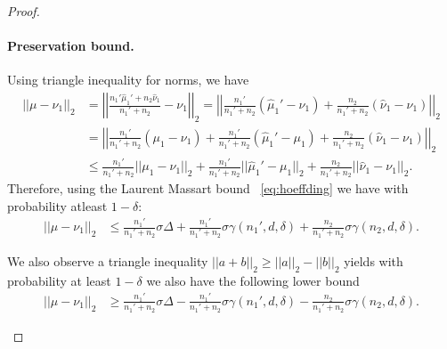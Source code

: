 \begin{proof}
\paragraph{Preservation bound.} Using triangle inequality for norms, we have 
\begin{align*}
    ||\mu - \nu_1||_2
    &
    = 
    \left|\left|\frac{n_1' \hat{\mu}_1' + n_2 \hat{\nu}_1}{n_1' + n_2}
    -
    \nu_1 \right|\right|_2 
    = 
    \left|\left|\frac{n_1'}{n_1' + n_2} (\hat{\mu}_1' - \nu_1) 
    +
    \frac{n_2}{n_1' + n_2} (\hat{\nu}_1 - \nu_1) \right|\right|_2
    \\
    &
    = 
    \left|\left|\frac{n_1'}{n_1' + n_2} (\mu_1 - \nu_1) 
    +
    \frac{n_1'}{n_1' + n_2} (\hat{\mu}_1' - \mu_1) 
    + 
    \frac{n_2}{n_1' + n_2} (\hat{\nu}_1 - \nu_1) \right|\right|_2
    \\
    &
    \leq \frac{n_1'}{n_1' + n_2} ||\mu_1 - \nu_1||_2 +
    \frac{n_1'}{n_1' + n_2} ||\hat{\mu}_1' - \mu_1||_2
    +
    \frac{n_2}{n_1' + n_2} ||\hat{\nu}_1 - \nu_1||_2.
\end{align*}
Therefore, using the Laurent Massart bound ~\eqref{eq:hoeffding} we have with probability atleast $1-\delta$:
\begin{align*}
    ||\mu - \nu_1||_2
    &\leq \frac{n_1'}{n_1' + n_2} \sigma \Delta + \frac{n_1'}{n_1' + n_2} \sigma \gamma(n_1',d,\delta) + \frac{n_2}{n_1' + n_2} \sigma \gamma(n_2, d,\delta).
\end{align*}
\begin{remark} \label{rem:lowerboundRR}
    We also observe a triangle inequality $||a+b||_2 \geq ||a||_2 -||b||_2$ yields with probability at least $1-\delta$ we also have the following lower bound
    \begin{align*}
    ||\mu - \nu_1||_2
    &\geq
    \frac{n_1'}{n_1' + n_2} \sigma \Delta 
    -
    \frac{n_1'}{n_1' + n_2} \sigma \gamma(n_1',d,\delta) 
    -
    \frac{n_2}{n_1' + n_2} \sigma \gamma(n_2, d,\delta).
\end{align*}
\end{remark}

\end{proof}
